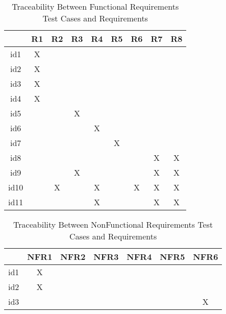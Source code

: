 \documentclass[12pt, titlepage]{article}
\begin{document}
\begin{table}[h!]
\centering
\begin{tabular}{|c|c|c|c|c|c|c|c|c|}
\hline        
	& R1& R2 & R3 &R4 & R5 &R6  &R7 &R8 \\
\hline
id1        & X &    &     &    &    &    &   &     \\ \hline
id2        & X &    &     &    &    &    &   &     \\ \hline
id3        & X &    &     &    &    &    &   &     \\ \hline
id4        & X &    &     &    &    &    &   &     \\ \hline
id5        &    &    & X  &    &    &    &   &     \\ \hline
id6        &    &    &     & X &    &    &   &     \\ \hline
id7        &    &    &     &    & X &    &   &     \\ \hline
id8        &    &    &     &    &    &    & X & X   \\ \hline
id9        &    &    & X  &    &    &    & X & X   \\ \hline
id10      &    & X &     & X &    & X & X & X   \\ \hline
id11      &    &    &     & X &    &    & X & X  \\ \hline


\hline
\end{tabular}
\caption{Traceability Between Functional Requirements Test Cases and
Requirements}
\label{Table:trace}
\end{table}

\begin{table}[h!]
\centering
\begin{tabular}{|c|c|c|c|c|c|c|}
\hline        
	& NFR1& NFR2 & NFR3 &NFR4 & NFR5 &NFR6 \\
\hline
id1        & X &    &     &    &    &     \\ \hline
id2        & X &    &     &    &    &     \\ \hline
id3        &    &    &     &    &    & X  \\ \hline


\hline
\end{tabular}
\caption{Traceability Between NonFunctional Requirements Test Cases and
Requirements}
\label{Table:trace}
\end{table}


\end{document}
